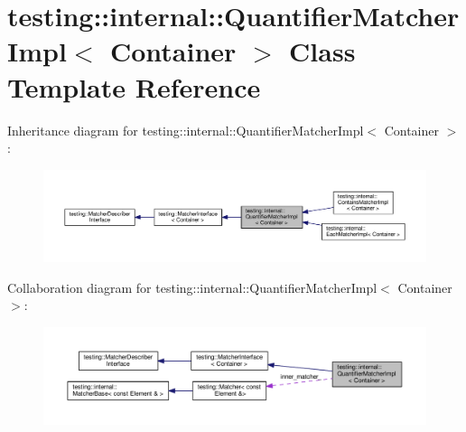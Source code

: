 \hypertarget{classtesting_1_1internal_1_1_quantifier_matcher_impl}{}\section{testing\+:\+:internal\+:\+:Quantifier\+Matcher\+Impl$<$ Container $>$ Class Template Reference}
\label{classtesting_1_1internal_1_1_quantifier_matcher_impl}


Inheritance diagram for testing\+:\+:internal\+:\+:Quantifier\+Matcher\+Impl$<$ Container $>$\+:
\nopagebreak
\begin{figure}[H]
\begin{center}
\leavevmode
\includegraphics[width=350pt]{classtesting_1_1internal_1_1_quantifier_matcher_impl__inherit__graph}
\end{center}
\end{figure}


Collaboration diagram for testing\+:\+:internal\+:\+:Quantifier\+Matcher\+Impl$<$ Container $>$\+:
\nopagebreak
\begin{figure}[H]
\begin{center}
\leavevmode
\includegraphics[width=350pt]{classtesting_1_1internal_1_1_quantifier_matcher_impl__coll__graph}
\end{center}
\end{figure}
